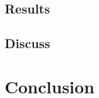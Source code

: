 \documentclass{techrep} %
\begin{document}
\section{Results}
\section{Discuss}
\chapter*{Conclusion}

 \nocite{*}
\end{document}
